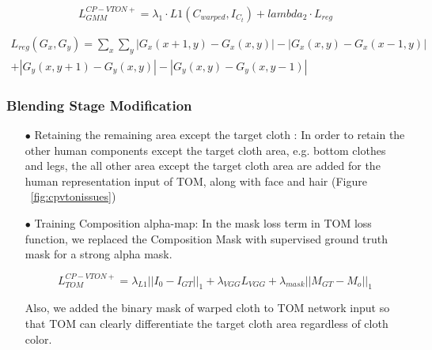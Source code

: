 \begin{itemize}


\begin{equation}
 L_{GMM}^{CP-VTON+}  = \lambda_1 \cdot L1(C_{warped}, I_{C_t}) + lambda_2 \cdot  L_{reg}  
\end{equation}

\begin{equation}\label{eq:gridloss}
\begin{aligned}
 L_{reg} (G_x, G_y) = \sum_x \sum_y | G_x(x+1, y) - G_x(x, y) | - | G_x(x, y) - G_x(x-1, y) | \\
 + | G_y(x, y+1) - G_y(x, y) | - | G_y(x, y) - G_y(x, y-1) |
\end{aligned}
\end{equation}


\end{itemize}

\subsubsection{Blending Stage Modification }


\begin{itemize}

\item[$\bullet$] Retaining the remaining area except the target cloth  :
In order to retain the other human components except the target cloth area, e.g. bottom clothes and legs, the all other area except the target cloth area are added for the human representation input of TOM, along with face and hair (Figure ~\ref{fig:cpvtonissues})

\item[$\bullet$] Training Composition alpha-map:  
In the mask loss term in TOM loss function, we replaced the Composition Mask with supervised ground truth mask for a strong alpha mask.

\begin{equation}
 L_{TOM}^{CP-VTON+} = \lambda_{L1} || I_0-I_{GT}||_1+  \lambda_{VGG} L_{VGG} + \lambda_{mask} ||M_{GT}-M_o||_1       
\end{equation}

Also, we added the binary mask of warped cloth to TOM network input so that TOM can clearly differentiate the target cloth area regardless of cloth color.  

\end{itemize}

